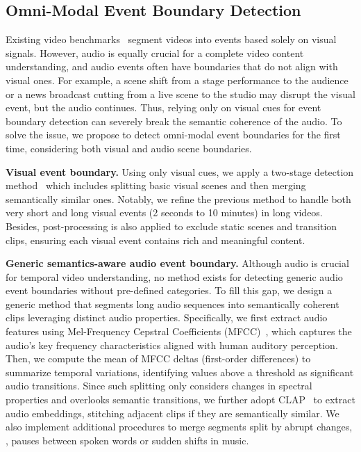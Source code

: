 \subsection{Omni-Modal Event Boundary Detection}
\label{sec:boundary}
Existing video benchmarks~\cite{wang2023internvid,chen2024panda,krishna2017dense,gao2017tall} segment videos into events based solely on visual signals. 
However, audio is equally crucial for a complete video content understanding, and audio events often have boundaries that do not align with visual ones. 
For example, a scene shift from a stage performance to the audience or a news broadcast cutting from a live scene to the studio may disrupt the visual event, but the audio continues.
Thus, relying only on visual cues for event boundary detection can severely break the semantic coherence of the audio.
To solve the issue, we propose to detect omni-modal event boundaries for the first time, considering both visual and audio scene boundaries. 

\noindent \textbf{Visual event boundary.}
Using only visual cues, we apply a two-stage detection method~\cite{chen2024panda} which includes splitting basic visual scenes and then merging semantically similar ones.
Notably, we refine the previous method to handle both very short and long visual events (2 seconds to 10 minutes) in long videos.
Besides, post-processing is also applied to exclude static scenes and transition clips, ensuring each visual event contains rich and meaningful content.

\noindent \textbf{Generic semantics-aware audio event boundary.}
Although audio is crucial for temporal video understanding, no method exists for detecting generic audio event boundaries without pre-defined categories.
To fill this gap, we design a generic method that segments long audio sequences into semantically coherent clips leveraging distinct audio properties.
Specifically, we first extract audio features using Mel-Frequency Cepstral Coefficients (MFCC)~\cite{juvela2018speech,hansen2015speaker},
which captures the audio's key frequency characteristics aligned with human auditory perception.
Then, we compute the mean of MFCC deltas (first-order differences) to summarize temporal variations, identifying values above a threshold as significant audio transitions.
Since such splitting only considers changes in spectral properties and overlooks semantic transitions, we further adopt CLAP~\cite{wu2023large} to extract audio embeddings, stitching adjacent clips if they are semantically similar.
We also implement additional procedures to merge segments split by abrupt changes, \eg, pauses between spoken words or sudden shifts in music.  

